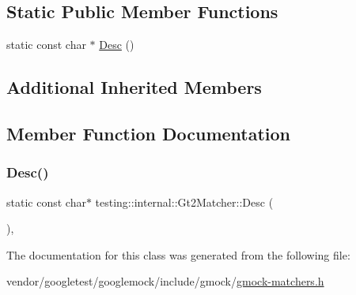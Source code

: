 \subsection*{Static Public Member Functions}
\begin{DoxyCompactItemize}
\item 
static const char $\ast$ \hyperlink{classtesting_1_1internal_1_1_gt2_matcher_a195be80a6c19ff32fc7b6c1e26aa60da}{Desc} ()
\end{DoxyCompactItemize}
\subsection*{Additional Inherited Members}


\subsection{Member Function Documentation}
\mbox{\label{classtesting_1_1internal_1_1_gt2_matcher_a195be80a6c19ff32fc7b6c1e26aa60da}} 
\subsubsection{\texorpdfstring{Desc()}{Desc()}}
{\footnotesize\ttfamily static const char$\ast$ testing\+::internal\+::\+Gt2\+Matcher\+::\+Desc (\begin{DoxyParamCaption}{ }\end{DoxyParamCaption})\hspace{0.3cm}{\ttfamily [inline]}, {\ttfamily [static]}}



The documentation for this class was generated from the following file\+:\begin{DoxyCompactItemize}
\item 
vendor/googletest/googlemock/include/gmock/\hyperlink{gmock-matchers_8h}{gmock-\/matchers.\+h}\end{DoxyCompactItemize}
